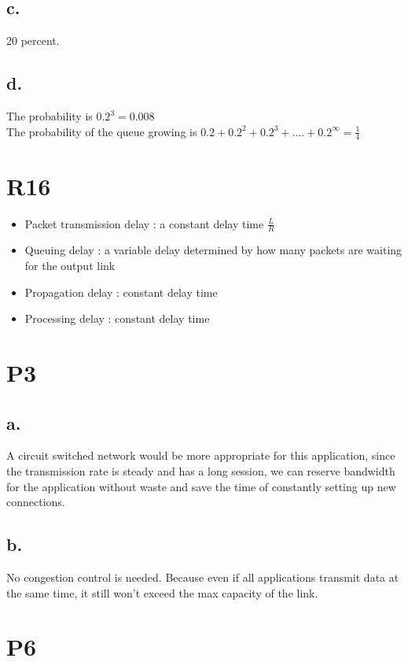 \documentclass[11pt,a4paper]{article}
\begin{document}
\subsection{c.}
20 percent.

\subsection{d.}
The probability is $0.2^3 = 0.008$ \\
The probability of the queue growing is $0.2 + 0.2^2 + 0.2^3 + .... + 0.2^\infty = \frac{1}{4}$

\section{R16}
\begin{itemize}
    \item Packet transmission delay : a constant delay time $\frac{L}{R}$ 
    \item Queuing delay : a variable delay determined by how many packets are waiting for the output link
    \item Propagation delay : constant delay time
    \item Processing delay : constant delay time
\end{itemize}

\section{P3}

\subsection{a.}
A circuit switched network would be more appropriate for this application, since the transmission rate is steady and has a long session, we can reserve 
bandwidth for the application without waste and save the time of constantly setting up new connections.

\subsection{b.}
No congestion control is needed. Because even if all applications transmit data at the same time, it still won't exceed the max capacity of the link.

\section{P6}
\end{document}
